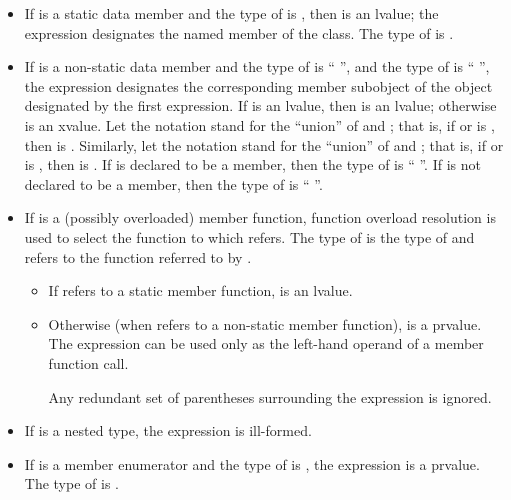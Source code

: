 \begin{itemize}
\item If  is a static data member and the type of 
is , then  is an lvalue; the expression designates
the named member of the class. The type of  is .

\item If  is a non-static data member and the type of
 is `` '', and the type of 
is `` '', the expression designates the corresponding
member subobject of the object designated by the first expression. If 
is an lvalue, then  is an lvalue;
otherwise  is an xvalue.
Let the notation  stand for the ``union'' of
 and ; that is, if  or 
is , then  is . Similarly,
let the notation  stand for the ``union'' of 
and ; that is, if  or  is
, then  is . If  is
declared to be a  member, then the type of 
is `` ''. If  is not declared to be a
 member, then the type of  is
``  ''.

\item If  is a (possibly overloaded) member function,
function overload resolution
is used to select the function to which  refers.
The type of  is the type of 
and  refers to the function referred to by .

\begin{itemize}
\item If  refers to a static member function,
 is an lvalue.

\item Otherwise (when  refers to a non-static member function),
 is a prvalue. The expression can be used only as the
left-hand operand of a member function call.
\begin{note}
Any redundant set of parentheses surrounding the expression
is ignored.
\end{note}
\end{itemize}

\item If  is a nested type, the expression  is
ill-formed.

\item If  is a member enumerator and the type of 
is , the expression  is a prvalue. The type of
 is .
\end{itemize}

